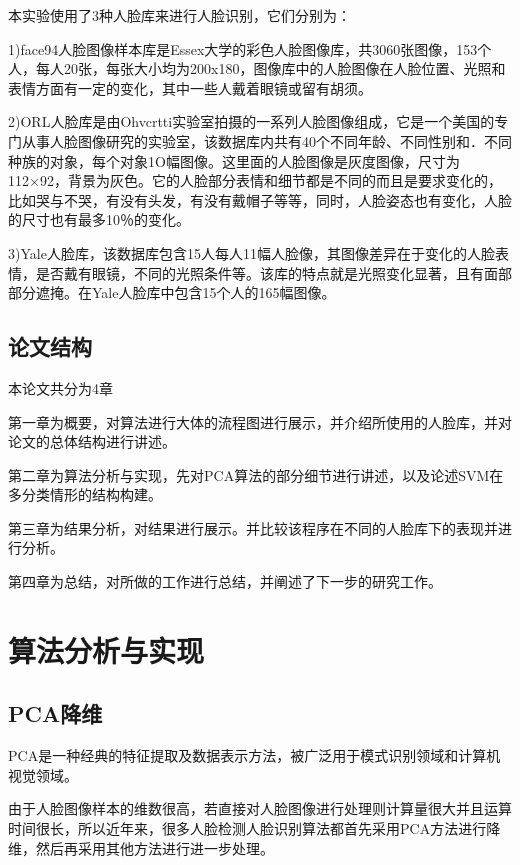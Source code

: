 \documentclass[a4paper,12pt]{ctexart}
\begin{document}
本实验使用了3种人脸库来进行人脸识别，它们分别为：

1)\quad face94人脸图像样本库是Essex大学的彩色人脸图像库，共3060张图像，153个人，每人20张，每张大小均为200x180，图像库中的人脸图像在人脸位置、光照和表情方面有一定的变化，其中一些人戴着眼镜或留有胡须。

2)\quad ORL人脸库是由Ohvcrtti实验室拍摄的一系列人脸图像组成，它是一个美国的专门从事人脸图像研究的实验室，该数据库内共有40个不同年龄、不同性别和．不同种族的对象，每个对象1O幅图像。这里面的人脸图像是灰度图像，尺寸为112×92，背景为灰色。它的人脸部分表情和细节都是不同的而且是要求变化的，比如哭与不哭，有没有头发，有没有戴帽子等等，同时，人脸姿态也有变化，人脸的尺寸也有最多10％的变化。


3)\quad Yale人脸库，该数据库包含15人每人11幅人脸像，其图像差异在于变化的人脸表情，是否戴有眼镜，不同的光照条件等。该库的特点就是光照变化显著，且有面部部分遮掩。在Yale人脸库中包含15个人的165幅图像。


\subsection{论文结构}
本论文共分为4章

第一章为概要，对算法进行大体的流程图进行展示，并介绍所使用的人脸库，并对论文的总体结构进行讲述。

第二章为算法分析与实现，先对PCA算法的部分细节进行讲述，以及论述SVM在多分类情形的结构构建。

第三章为结果分析，对结果进行展示。并比较该程序在不同的人脸库下的表现并进行分析。

第四章为总结，对所做的工作进行总结，并阐述了下一步的研究工作。

\newpage
\section{算法分析与实现}

\subsection{PCA降维}
PCA是一种经典的特征提取及数据表示方法，被广泛用于模式识别领域和计算机视觉领域。

由于人脸图像样本的维数很高，若直接对人脸图像进行处理则计算量很大并且运算时间很长，所以近年来，很多人脸检测人脸识别算法都首先采用PCA方法进行降维，然后再采用其他方法进行进一步处理。
\end{document}

